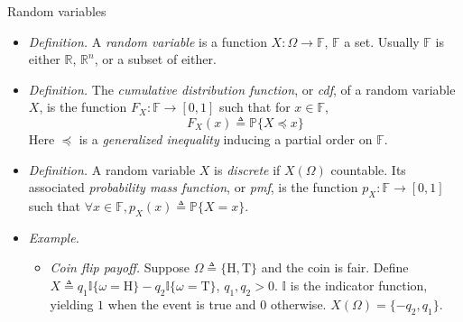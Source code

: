 \documentclass{beamer}
\numberwithin{equation}{section}
\begin{document}
\begin{frame}{Random variables}
    \begin{itemize}
        \item
        \textit{Definition.} A \textit{random variable} is a function
        $ X : \Omega \rightarrow \mathbb{F} $, $ \mathbb{F} $ a
        set\footnotemark{}. Usually $ \mathbb{F} $ is either $ \mathbb{R} $,
        $ \mathbb{R}^n $, or a subset of either.

        \item
        \textit{Definition.} The \textit{cumulative distribution function},
        or \textit{cdf}, of a random variable $ X $, is the function
        $ F_X : \mathbb{F} \rightarrow [0, 1] $ such that for
        $ x \in \mathbb{F} $,
        \begin{equation*}
            F_X(x) \triangleq \mathbb{P}\{X \preceq x\}
        \end{equation*}
        Here $ \preceq $ is a \textit{generalized inequality} inducing a
        partial order on $ \mathbb{F} $.

        \item
        \textit{Definition.} A random variable $ X $ is \textit{discrete} if
        $ X(\Omega) $ countable. Its associated \textit{probability mass
        function}, or \textit{pmf}, is the function
        $ p_X : \mathbb{F} \rightarrow [0, 1] $ such that
        $ \forall x \in \mathbb{F}, p_X(x) \triangleq \mathbb{P}\{X = x\} $.

        \item
        \textit{Example.}
        \begin{itemize}
            \item
            \textit{Coin flip payoff.} Suppose $ \Omega
            \triangleq \{\text{H}, \text{T}\} $ and the coin is fair. Define
            $ X \triangleq q_1\mathbb{I}\{\omega = \text{H}\} - q_2
            \mathbb{I}\{\omega = \text{T}\} $, $ q_1, q_2 > 0 $.
            $ \mathbb{I} $ is the indicator function, yielding $ 1 $ when
            the event is true and $ 0 $ otherwise.
            $ X(\Omega) = \{-q_2, q_1\} $.
        \end{itemize}
    \end{itemize}

    \medskip

\end{frame}
\end{document}
